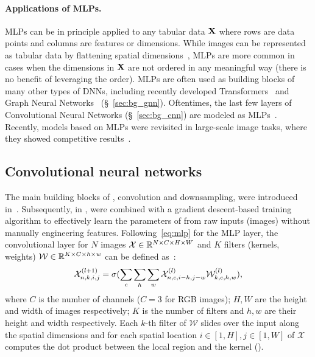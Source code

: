 \paragraph{Applications of MLPs.} MLPs can be in principle applied to any tabular data $\mathbf{X}$ where rows are data points and columns are features or dimensions. While images can be represented as tabular data by flattening spatial dimensions~\citep{ciregan2012multi}, MLPs are more common in cases when the dimensions in $\mathbf{X}$ are not ordered in any meaningful way (\ie there is no benefit of leveraging the order).
MLPs are often used as building blocks of many other types of DNNs, including recently developed Transformers~\citep{vaswani2017attention,dosovitskiy2020image} and Graph Neural Networks~\citep{kipf2016semi} (\S~\ref{sec:bg_gnn}). Oftentimes, the last few layers of Convolutional Neural Networks (\S~\ref{sec:bg_cnn}) are modeled as MLPs~\citep{simonyan2014very}.
Recently, models based on MLPs were revisited in large-scale image tasks, where they showed competitive results~\citep{touvron2021resmlp}.

\subsection{Convolutional neural networks\label{sec:bg_cnn}}

The main building blocks of \cnns, convolution and downsampling, were introduced in~\citep{fukushima1982neocognitron}.
Subsequently, in \citep{lecun1998gradient}, \cnns were combined with a gradient descent-based training algorithm to effectively learn the parameters of \cnns from raw inputs (images) without manually engineering features.
Following~\eqref{eq:mlp} for the MLP layer, the convolutional layer for $N$ images ${\cal X} \in \mathbb{R}^{N \times C \times H \times W}$ and $K$ filters (kernels, weights) $\mathcal{W} \in \mathbb{R}^{K \times C \times h \times w}$ can be defined as~\citep{vedaldi2015matconvnet}:
%
\begin{equation}
    \label{eq:conv}
    {\cal X}_{n,k,i,j}^{(l+1)} = \sigma(\sum_c \sum_h \sum_w {\cal X}_{n,c,i-h,j-w}^{(l)} {\cal W}_{k,c,h,w}^{(l)}),
\end{equation}
%
\noindent where $C$ is the number of channels (\eg $C=3$ for RGB images); $H,W$ are the height and width of images respectively; $K$ is the number of filters and $h,w$ are their height and width respectively. Each $k$-th filter of $\mathcal{W}$ slides over the input along the spatial dimensions and for each spatial location $i \in [1,H], j \in [1,W]$ of $\mathcal{X}$ computes the dot product between the local region and the kernel (\fig{\ref{fig:conv}}).



